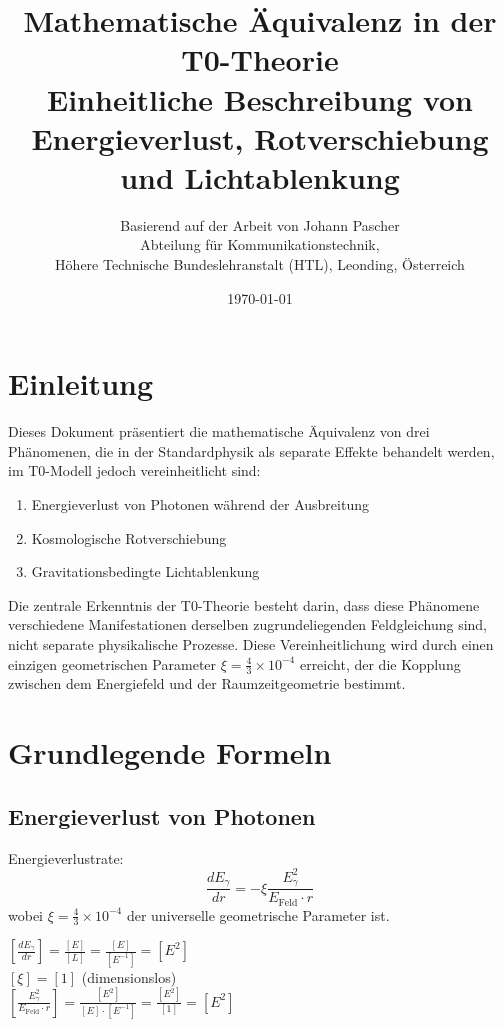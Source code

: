 \documentclass[12pt,a4paper]{article}
\title{\Huge\textbf{Mathematische Äquivalenz in der T0-Theorie}\\\Large Einheitliche Beschreibung von Energieverlust, Rotverschiebung und Lichtablenkung}
\author{Basierend auf der Arbeit von Johann Pascher\\
	Abteilung für Kommunikationstechnik, \\Höhere Technische Bundeslehranstalt (HTL), Leonding, Österreich}
\date{\today}
\newcommand{\efield}{E_{\text{Feld}}}
\theoremstyle{definition}
\begin{document}
	
	\maketitle
	\tableofcontents
	\thispagestyle{fancy}
	\newpage
	
	\section{Einleitung}
	
	Dieses Dokument präsentiert die mathematische Äquivalenz von drei Phänomenen, die in der Standardphysik als separate Effekte behandelt werden, im T0-Modell jedoch vereinheitlicht sind:
	
	\begin{enumerate}
		\item Energieverlust von Photonen während der Ausbreitung
		\item Kosmologische Rotverschiebung
		\item Gravitationsbedingte Lichtablenkung
	\end{enumerate}
	
	Die zentrale Erkenntnis der T0-Theorie besteht darin, dass diese Phänomene verschiedene Manifestationen derselben zugrundeliegenden Feldgleichung sind, nicht separate physikalische Prozesse. Diese Vereinheitlichung wird durch einen einzigen geometrischen Parameter $\xi = \frac{4}{3} \times 10^{-4}$ erreicht, der die Kopplung zwischen dem Energiefeld und der Raumzeitgeometrie bestimmt.
	
	\section{Grundlegende Formeln}
	
	\subsection{Energieverlust von Photonen}
	
	\begin{formel}
		Energieverlustrate:
		\begin{equation}
			\boxed{\frac{dE_\gamma}{dr} = -\xi \frac{E_\gamma^2}{\efield \cdot r}}
		\end{equation}
		wobei $\xi = \frac{4}{3} \times 10^{-4}$ der universelle geometrische Parameter ist.
	\end{formel}
	
	\begin{dimanalysis}
		$\left[\frac{dE_\gamma}{dr}\right] = \frac{[E]}{[L]} = \frac{[E]}{[E^{-1}]} = [E^2]$\\
		$[\xi] = [1]$ (dimensionslos)\\
		$\left[\frac{E_\gamma^2}{\efield \cdot r}\right] = \frac{[E^2]}{[E] \cdot [E^{-1}]} = \frac{[E^2]}{[1]} = [E^2]$ \checkmark
	\end{dimanalysis}
	
\end{document}
